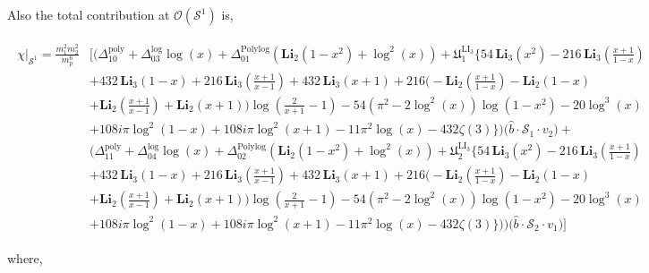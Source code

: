 Also the total contribution at $\mathcal{O}(\mathcal{S}^1)$ is, 
\enlargethispage{2\baselineskip}
\begin{thesiscompactdisplay}[\scriptsize]
\begin{align}
\begin{split}
\chi\Big|_{\mathcal{S}^1} =\frac{m_1^2m_2^2}{m_p^6}&\Bigg[\Big(\Delta_{\mathfrak{10}}^{\textrm{poly}}+\Delta_{\mathfrak{03}}^{\textrm{log}}\log (x)+\Delta_{\mathfrak{01}}^{\textrm{Polylog}}\left(\textbf{Li}_2(1-x^2)+\log^2(x)\right)+\boldsymbol{\mathfrak{U}}_{\mathfrak{1}}^{\textrm{LI}_3}\Big\{54\, \textbf{Li}_3\left(x^2\right)-216\, \textbf{Li}_3\left(\frac{x+1}{1-x}\right)
\\ &+432\, \textbf{Li}_3(1-x)+216\, \textbf{Li}_3\left(\frac{x+1}{x-1}\right)+432\, \textbf{Li}_3(x+1)+216 \Big(-\textbf{Li}_2\left(\frac{x+1}{1-x}\right)-\textbf{Li}_2(1-x)\\ &+\textbf{Li}_2\left(\frac{x+1}{x-1}\right)+\textbf{Li}_2(x+1)\Big) \log \left(\frac{2}{x+1}-1\right)-54 \left(\pi ^2-2 \log ^2(x)\right) \log \left(1-x^2\right)-20 \log ^3(x)\\ &+108 i \pi  \log ^2(1-x)+108 i \pi  \log ^2(x+1)-11 \pi ^2 \log (x)-432 \zeta (3)\Big\}\Big)\Big(\hat{b}\cdot \mathcal{S}_1\cdot v_2\Big)+\\&\Big(\Delta_{\mathfrak{11}}^{\textrm{poly}}+\Delta_{\mathfrak{04}}^{\textrm{log}}\log (x)+\Delta_{\mathfrak{02}}^{\textrm{Polylog}}\left(\textbf{Li}_2(1-x^2)+\log^2(x)\right)+\boldsymbol{\mathfrak{U}}_{\mathfrak{2}}^{\textrm{LI}_3}\Big\{54\, \textbf{Li}_3\left(x^2\right)-216\, \textbf{Li}_3\left(\frac{x+1}{1-x}\right)
\\ &+432\, \textbf{Li}_3(1-x)+216\, \textbf{Li}_3\left(\frac{x+1}{x-1}\right)+432\, \textbf{Li}_3(x+1)+216 \Big(-\textbf{Li}_2\left(\frac{x+1}{1-x}\right)-\textbf{Li}_2(1-x)\\ &+\textbf{Li}_2\left(\frac{x+1}{x-1}\right)+\textbf{Li}_2(x+1)\Big) \log \left(\frac{2}{x+1}-1\right)-54 \left(\pi ^2-2 \log ^2(x)\right) \log \left(1-x^2\right)-20 \log ^3(x)\\ &+108 i \pi  \log ^2(1-x)+108 i \pi  \log ^2(x+1)-11 \pi ^2 \log (x)-432 \zeta (3)\Big\}\Big)\Big)\Big(\hat{b}\cdot \mathcal{S}_2\cdot v_1\Big)\Bigg]
\end{split}
\end{align}
\end{thesiscompactdisplay}
\enlargethispage{2\baselineskip}
where,
